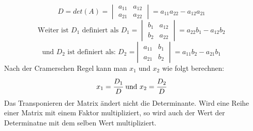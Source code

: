 \documentclass[a4paper,10pt]{scrartcl}
\begin{document}
        \[
            D = det(A) = 
            \begin{vmatrix}
                a_{11} & a_{12} \\
                a_{21} & a_{22}
            \end{vmatrix}
            = a_{11}a_{22} - a_{12}a_{21}
        \]
        \[
            \text{Weiter ist $D_1$ definiert als $D_1$} = 
            \begin{vmatrix}
                b_{1} & a_{12} \\
                b_{2} & a_{22}
            \end{vmatrix}
            = a_{22}b_1 - a_{12}b_2 
        \]
        \[
            \text{und $D_2$ ist definiert als: $D_2$ =} 
            \begin{vmatrix}
                a_{11} & b_{1} \\
                a_{21} & b_{2}
            \end{vmatrix}
            = a_{11}b_2 - a_{21}b_1
        \]
        Nach der Cramerschen Regel kann man $x_1$ und $x_2$ wie folgt berechnen: 
        \[
            x_1 = \cfrac{D_1}{D} \text{ und } x_2 = \cfrac{D_2}{D}
        \]
        Das Transponieren der Matrix ändert nicht die Determinante. Wird eine Reihe einer Matrix mit einem Faktor multipliziert, so wird auch der Wert der Determinatne mit dem selben 
        Wert multipliziert. 
        \newpage
\end{document}
